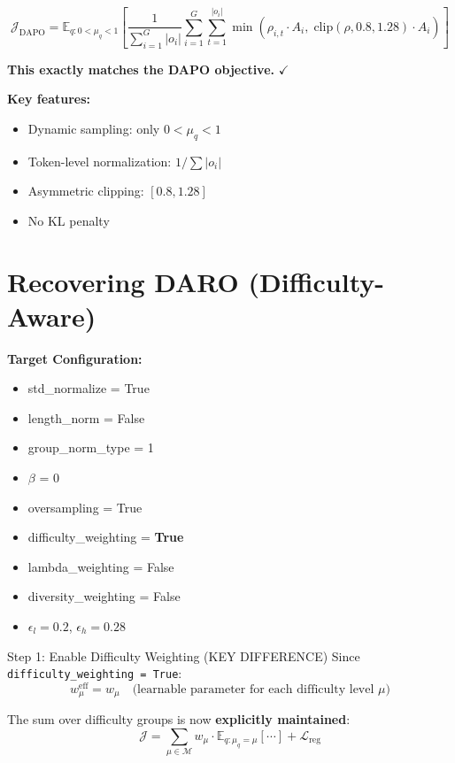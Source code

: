 \documentclass[11pt,a4paper]{article}
\begin{document}
\begin{resultbox}
\begin{equation}
\mathcal{J}_{\text{DAPO}} = \mathbb{E}_{q: 0 < \mu_q < 1} \left[ \frac{1}{\sum_{i=1}^G |o_i|} \sum_{i=1}^{G} \sum_{t=1}^{|o_i|} \min\left( \rho_{i,t} \cdot A_i, \; \text{clip}(\rho, 0.8, 1.28) \cdot A_i \right) \right]
\end{equation}

\textbf{This exactly matches the DAPO objective.} $\checkmark$

\textbf{Key features:}
\begin{itemize}
    \item Dynamic sampling: only $0 < \mu_q < 1$
    \item Token-level normalization: $1/\sum|o_i|$
    \item Asymmetric clipping: $[0.8, 1.28]$
    \item No KL penalty
\end{itemize}
\end{resultbox}

\newpage

\section{Recovering DARO (Difficulty-Aware)}

\begin{configbox}
\textbf{Target Configuration:}
\begin{itemize}[noitemsep]
    \item std\_normalize = True
    \item length\_norm = False
    \item group\_norm\_type = 1
    \item $\beta$ = 0
    \item oversampling = True
    \item difficulty\_weighting = \textbf{True}
    \item lambda\_weighting = False
    \item diversity\_weighting = False
    \item $\epsilon_l = 0.2$, $\epsilon_h = 0.28$
\end{itemize}
\end{configbox}

\begin{proofbox}{Step 1: Enable Difficulty Weighting (KEY DIFFERENCE)}
Since \texttt{difficulty\_weighting = True}:
\begin{equation}
w_\mu^{\text{eff}} = w_\mu \quad \text{(learnable parameter for each difficulty level } \mu \text{)}
\end{equation}

The sum over difficulty groups is now \textbf{explicitly maintained}:
\begin{equation}
\mathcal{J} = \sum_{\mu \in \mathcal{M}} w_\mu \cdot \mathbb{E}_{q: \mu_q = \mu}[\cdots] + \mathcal{L}_{\text{reg}}
\end{equation}
\end{proofbox}
\end{document}
